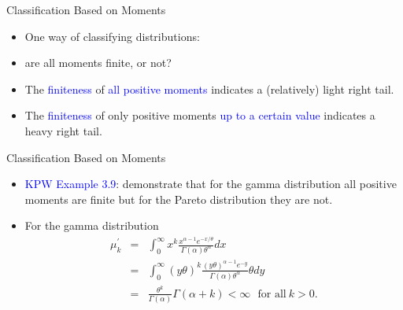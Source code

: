 \documentclass{beamer}
\begin{document}
\begin{frame}{Classification Based on Moments}
\begin{itemize}
\item One way of classifying distributions:
\vspace{0.3cm}
\item[] are all moments finite, or not?
\vspace{0.3cm}
\item The \textcolor{blue}{finiteness} of \textcolor{blue}{all positive moments} indicates a (relatively) light right tail.
\vspace{0.3cm}
\item The \textcolor{blue}{finiteness} of only positive moments \textcolor{blue}{up to a certain value} indicates a heavy right tail.
\end{itemize}
\end{frame}

\begin{frame}{Classification Based on Moments}
\begin{itemize}
\item \textcolor{blue}{KPW Example 3.9}: demonstrate that for the gamma distribution all positive moments are finite but for the Pareto distribution they are not.
\vspace{0.3cm}
\item For the gamma distribution
\begin{eqnarray*}
\mu_k^{'} &=& \int_0^{\infty} x^k \frac{x^{\alpha-1} e^{-x/\theta}}{\Gamma(\alpha) \theta^{\alpha}} dx \\
&=& \int_0^{\infty} (y\theta)^k  \frac{(y\theta)^{\alpha-1} e^{-y}}{\Gamma(\alpha) \theta^{\alpha}} \theta dy \\
&=& \frac{\theta^k}{\Gamma(\alpha)} \Gamma(\alpha+k) < \infty \ \ \ \text{for\ all}\ k>0.
\end{eqnarray*}
\end{itemize}
\end{frame}
\end{document}
